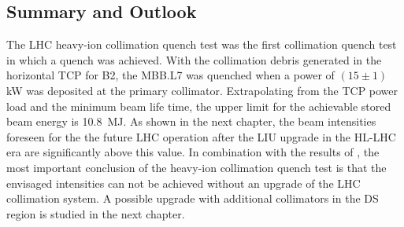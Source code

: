 


\subsection{Summary and Outlook}


The LHC heavy-ion collimation quench test was the first collimation quench test in which a quench was achieved. With the collimation debris generated in the horizontal TCP for B2, the MBB.L7 was quenched when a power of $(15\pm 1)\,$kW was deposited at the primary collimator. Extrapolating from the TCP power load and the minimum beam life time, the upper limit for the achievable stored beam energy is 10.8~MJ. As shown in the next chapter, the beam intensities foreseen for the the future LHC operation after the LIU upgrade in the HL-LHC era are significantly above this value. In combination with the results of , the most important conclusion of the heavy-ion collimation quench test is that the envisaged intensities can not be achieved without an upgrade of the LHC collimation system. A possible upgrade with additional collimators in the DS region is studied in the next chapter. 





